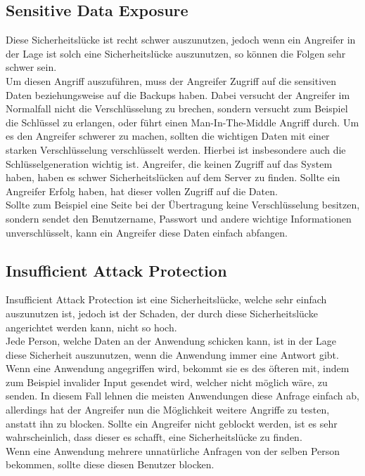 \subsection{Sensitive Data Exposure}
Diese Sicherheitslücke ist recht schwer auszunutzen, jedoch wenn ein Angreifer in der Lage ist solch eine Sicherheitslücke auszunutzen, so können die Folgen sehr schwer sein. \\
Um diesen Angriff auszuführen, muss der Angreifer Zugriff auf die sensitiven Daten beziehungsweise auf die Backups haben. Dabei versucht der Angreifer im Normalfall nicht die Verschlüsselung zu brechen, sondern versucht zum Beispiel die Schlüssel zu erlangen, oder führt einen Man-In-The-Middle Angriff durch. Um es den Angreifer schwerer zu machen, sollten die wichtigen Daten mit einer starken Verschlüsselung verschlüsselt werden. Hierbei ist insbesondere auch die Schlüsselgeneration wichtig ist. Angreifer, die keinen Zugriff auf das System haben, haben es schwer Sicherheitslücken auf dem Server zu finden. Sollte ein Angreifer Erfolg haben, hat dieser vollen Zugriff auf die Daten. \\
Sollte zum Beispiel eine Seite bei der Übertragung keine Verschlüsselung besitzen, sondern sendet den Benutzername, Passwort und andere wichtige Informationen unverschlüsselt, kann ein Angreifer diese Daten einfach abfangen.
\subsection{Insufficient Attack Protection}
Insufficient Attack Protection ist eine Sicherheitslücke, welche sehr einfach auszunutzen ist, jedoch ist der Schaden, der durch diese Sicherheitslücke angerichtet werden kann, nicht so hoch. \\
Jede Person, welche Daten an der Anwendung schicken kann, ist in der Lage diese Sicherheit auszunutzen, wenn die Anwendung immer eine Antwort gibt. Wenn eine Anwendung angegriffen wird, bekommt sie es des öfteren mit, indem zum Beispiel invalider Input gesendet wird, welcher nicht möglich wäre, zu senden. In diesem Fall lehnen die meisten Anwendungen diese Anfrage einfach ab, allerdings hat der Angreifer nun die Möglichkeit weitere Angriffe zu testen, anstatt ihn zu blocken. Sollte ein Angreifer nicht geblockt werden, ist es sehr wahrscheinlich, dass dieser es schafft, eine Sicherheitslücke zu finden. \\
Wenn eine Anwendung mehrere unnatürliche Anfragen von der selben Person bekommen, sollte diese diesen Benutzer blocken.
